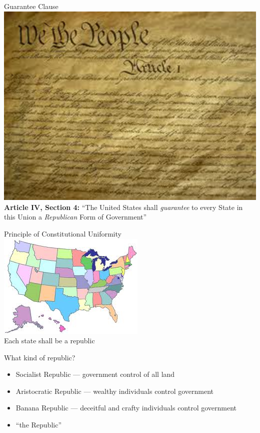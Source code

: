 \begin{frame}{Guarantee Clause}
    \centering
    \includegraphics[height=.7\textheight]{img/constitution.png} \\
    \textbf{Article IV, Section 4:} ``The United States shall \emph{guarantee} to every State in this Union a \emph{Republican} Form of Government''
\end{frame}

\begin{frame}{Principle of Constitutional Uniformity}
    \centering
    \includegraphics[height=.7\textheight]{img/us-map.png} \\
    \huge{Each state shall be a republic} \\
\end{frame}

\begin{frame}{What kind of republic?}
    \begin{itemize}
        \item Socialist Republic --- government control of all land
        \pause
        \item Aristocratic Republic --- wealthy individuals control government
        \pause
        \item Banana Republic --- deceitful and crafty individuals control government
        \pause
        \item ``the Republic''
    \end{itemize}
\end{frame}

